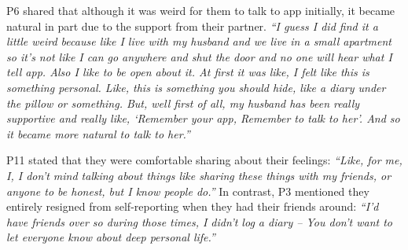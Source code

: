         P6 shared that although it was weird for them to talk to \acl{app} initially, it became natural in part due to the support from their partner.
        \textit{``I guess I did find it a little weird because like I live with my husband and we live in a small apartment so it's not like I can go anywhere and shut the door and no one will hear what I tell \acl{app}. Also I like to be open about it. At first it was like, I felt like this is something personal. Like, this is something you should hide, like a diary under the pillow or something. But, well first of all, my husband has been really supportive and really like, `Remember your \acl{app}, Remember to talk to her'. And so it became more natural to talk to her.'' }

        P11 stated that they were comfortable sharing about their feelings:
            \textit{
            ``Like, for me, I, I don't mind talking about things like sharing these things with my friends, or anyone to be honest, but I know people do.''
            }
        In contrast, P3 mentioned they entirely resigned from self-reporting when they had their friends around:
            \textit{``I’d have friends over so during those times, I didn’t log a diary -- You don’t want to let everyone know about deep personal life.''}

